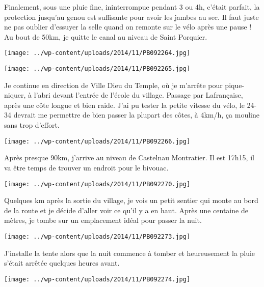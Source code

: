 Finalement, sous une pluie fine, ininterrompue pendant 3 ou 4h, c'était parfait, la protection jusqu'au genou est suffisante pour avoir les jambes au sec. Il faut juste ne pas oublier d'essuyer la selle quand on remonte sur le vélo après une pause ! \newline
 Au bout de 50km, je quitte le canal au niveau de Saint Porquier. \newline
 \newline
\centerline{\texttt{[image: ../wp-content/uploads/2014/11/PB092264.jpg]} } 
 \newline
 \newline
\centerline{\texttt{[image: ../wp-content/uploads/2014/11/PB092265.jpg]} } 
 \newline
 Je continue en direction de Ville Dieu du Temple, où je m'arrête pour pique-niquer, à l'abri devant l'entrée de l'école du village. \newline
 Passage par Lafrançaise, après une côte longue et bien raide. J'ai pu tester la petite vitesse du vélo, le 24-34 devrait me permettre de bien passer la plupart des côtes, à 4km/h, ça mouline sans trop d'effort. \newline
 \newline
\centerline{\texttt{[image: ../wp-content/uploads/2014/11/PB092266.jpg]} } 
 \newline
 Après presque 90km, j'arrive au niveau de Castelnau Montratier. Il est 17h15, il va être temps de trouver un endroit pour le bivouac. \newline
 \newline
\centerline{\texttt{[image: ../wp-content/uploads/2014/11/PB092270.jpg]} } 
 \newline
 Quelques km après la sortie du village, je vois un petit sentier qui monte au bord de la route et je décide d'aller voir ce qu'il y a en haut. Après une centaine de mètres, je tombe sur un emplacement idéal pour passer la nuit. \newline
 \newline
\centerline{\texttt{[image: ../wp-content/uploads/2014/11/PB092273.jpg]} } 
 \newline
 J'installe la tente alors que la nuit commence à tomber et heureusement la pluie s'était arrêtée quelques heures avant. \newline
 \newline
\centerline{\texttt{[image: ../wp-content/uploads/2014/11/PB092274.jpg]} } 
 \newline
